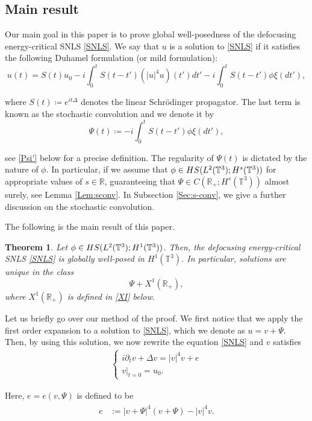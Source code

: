 \documentclass[letterpaper, 11pt,  reqno]{amsart}
\newtheorem{theorem}{Theorem} [section]
\newcommand{\1}{\hspace{0.5mm}\text{I}\hspace{0.5mm}}
\newcommand{\noi}{\noindent}
\newcommand{\R}{\mathbb{R}}
\newcommand{\T}{\mathbb{T}}
\newcommand{\Dl}{\Delta}
\newcommand{\dt}{\partial_t}
\newcommand{\HS}{\textup{HS}}
\numberwithin{equation}{section}
\numberwithin{theorem}{section}
\begin{document}
\subsection{Main result}
Our main goal in this paper is to prove global well-posedness of the defocusing energy-critical SNLS \eqref{SNLS}. We say that $u$ is a solution to \eqref{SNLS} if it satisfies the following Duhamel formulation (or mild formulation):
\[
u(t)
= S(t)u_0
    -i\int_0^t S(t-t') (|u|^4u) (t')dt'
    -i\int_0^t S(t-t')\phi\xi(dt'),
\]


\noi
where $S(t)\coloneqq e^{it\Delta}$ denotes the linear Schr\"{o}dinger propagator.
The last term is known as the stochastic convolution and we denote it by
\begin{equation}\label{Psi}
    \Psi(t)\coloneqq -i\int_0^t S(t-t')\phi\xi(dt'),
\end{equation}



\noi
see \eqref{Psi'} below for a precise definition. The regularity of $\Psi(t)$ is dictated by the nature of $\phi$. In particular, if we assume that $\phi\in\HS(L^2(\T^3);H^s(\T^3))$ for appropriate values of $s \in \R$, guaranteeing that $\Psi\in C(\R_+; H^s(\T^3))$ almost surely, see Lemma \ref{Lem:sconv}. In Subsection \ref{Sec:s-conv}, we give a further discussion on the stochastic convolution.



The following is the main result of this paper.
\begin{theorem}
\label{Th}
Let $\phi\in\HS(L^2(\T^3);H^1(\T^3))$. 
Then, the defocusing energy-critical SNLS \eqref{SNLS} is globally well-posed
in $H^1(\T^3)$.
In particular, solutions are unique in the class
\[
\Psi + X^1 (\R_+),
\]
where
$X^1(\R_+)$
is defined in \eqref{XI} below.
\end{theorem}



Let us briefly go over our method of the proof. 
We first notice that we apply the first order expansion to 
a solution to  \eqref{SNLS}, which we denote as 
$ u =v+\Psi$.
Then, by using this solution,
we now rewrite the equation \eqref{SNLS} and 
$v$ satisfies
\begin{align}\label{SNLS2}
\begin{cases}
i \dt v + \Dl  v =|v|^4v+ e \\
v|_{t = 0} = u_0.
\end{cases}
\end{align} 

\noi
Here, $e= e(v,\Psi)$ is defined to be
\begin{align}
\label{pert}
\begin{split}
e &:=|v+\Psi|^{4} (v+\Psi)-|v|^4v.
\end{split}
\end{align} 
\end{document}
